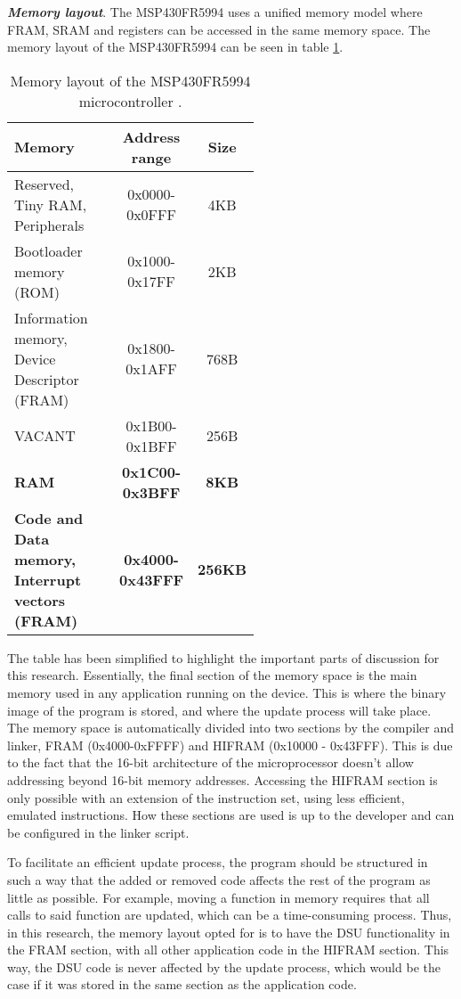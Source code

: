\textbf{\textit{Memory layout}}. The MSP430FR5994 uses a unified memory model where FRAM, SRAM and registers can be accessed in the same memory space. The memory layout of the MSP430FR5994 can be seen in table \ref{tab:memory_layout}.
\begin{table}
\centering
\begin{tabular}{|p{0.55\linewidth}|c|c|}
    \hline
    \textbf{Memory} & \textbf{Address range} & \textbf{Size} \\
    \hline
    Reserved, Tiny RAM, Peripherals & 0x0000-0x0FFF & 4KB \\
    \hline
    Bootloader memory (ROM) & 0x1000-0x17FF & 2KB \\
    \hline
    Information memory, Device Descriptor (FRAM) & 0x1800-0x1AFF & 768B \\
    \hline
    VACANT & 0x1B00-0x1BFF & 256B \\
    \hline
    \textbf{RAM} & \textbf{0x1C00-0x3BFF} & \textbf{8KB} \\
    \hline
    \textbf{Code and Data memory, Interrupt vectors (FRAM)} & \textbf{0x4000-0x43FFF} & \textbf{256KB} \\
    \hline
\end{tabular}
\caption{Memory layout of the MSP430FR5994 microcontroller \cite{fr5994DataSheet}.}
\label{tab:memory_layout}
\end{table}

The table has been simplified to highlight the important parts of discussion for this research. Essentially, the final section of the memory space is the main memory used in any application running on the device. This is where the binary image of the program is stored, and where the update process will take place. The memory space is automatically divided into two sections by the compiler and linker, FRAM (0x4000-0xFFFF) and HIFRAM (0x10000 - 0x43FFF). This is due to the fact that the 16-bit architecture of the microprocessor doesn't allow addressing beyond 16-bit memory addresses. Accessing the HIFRAM section is only possible with an extension of the instruction set, using less efficient, emulated instructions. How these sections are used is up to the developer and can be configured in the linker script. 

To facilitate an efficient update process, the program should be structured in such a way that the added or removed code affects the rest of the program as little as possible. For example, moving a function in memory requires that all calls to said function are updated, which can be a time-consuming process. Thus, in this research, the memory layout opted for is to have the DSU functionality in the FRAM section, with all other application code in the HIFRAM section. This way, the DSU code is never affected by the update process, which would be the case if it was stored in the same section as the application code. 

